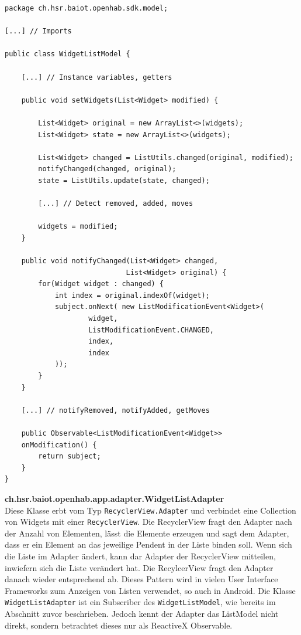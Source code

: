 \begin{lstlisting}[style=csharp, label=lst:widgetListModel, caption=Auszug aus WidgetListModel.java]
package ch.hsr.baiot.openhab.sdk.model;

[...] // Imports

public class WidgetListModel {
	
	[...] // Instance variables, getters

	public void setWidgets(List<Widget> modified) {

		List<Widget> original = new ArrayList<>(widgets);
		List<Widget> state = new ArrayList<>(widgets);

		List<Widget> changed = ListUtils.changed(original, modified);
		notifyChanged(changed, original);
		state = ListUtils.update(state, changed);

		[...] // Detect removed, added, moves
		
		widgets = modified;
	}

	public void notifyChanged(List<Widget> changed, 
							 List<Widget> original) {
		for(Widget widget : changed) {
			int index = original.indexOf(widget);
			subject.onNext( new ListModificationEvent<Widget>(
					widget,
					ListModificationEvent.CHANGED,
					index,
					index
			));
		}
	}

	[...] // notifyRemoved, notifyAdded, getMoves

	public Observable<ListModificationEvent<Widget>>
	onModification() {
		return subject;
	}
}

\end{lstlisting}

\textbf{ch.hsr.baiot.openhab.app.adapter.WidgetListAdapter}\\
Diese Klasse erbt vom Typ \lstinline!RecyclerView.Adapter! und verbindet eine Collection von Widgets mit einer \lstinline!RecyclerView!. Die RecyclerView fragt den Adapter nach der Anzahl von Elementen, lässt die Elemente erzeugen und sagt dem Adapter, dass er ein Element an das jeweilige Pendent in der Liste binden soll. Wenn sich die Liste im Adapter ändert, kann dar Adapter der RecyclerView mitteilen, inwiefern sich die Liste verändert hat. Die RecylcerView fragt den Adapter danach wieder entsprechend ab. Dieses Pattern wird in vielen User Interface Frameworks zum Anzeigen von Listen verwendet, so auch in Android. Die Klasse \lstinline!WidgetListAdapter! ist ein Subscriber des \lstinline!WidgetListModel!, wie bereits im Abschnitt zuvor beschrieben. Jedoch kennt der Adapter das ListModel nicht direkt, sondern betrachtet dieses nur als ReactiveX Observable.

